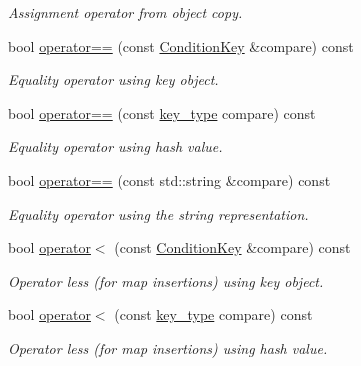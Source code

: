 \begin{DoxyCompactItemize}
\begin{DoxyCompactList}\small\item\em Assignment operator from object copy. \end{DoxyCompactList}\item 
bool \hyperlink{class_d_d4hep_1_1_conditions_1_1_condition_key_a57ce7c47f281c85dd5b584e28589c30f}{operator==} (const \hyperlink{class_d_d4hep_1_1_conditions_1_1_condition_key}{Condition\+Key} \&compare) const
\begin{DoxyCompactList}\small\item\em Equality operator using key object. \end{DoxyCompactList}\item 
bool \hyperlink{class_d_d4hep_1_1_conditions_1_1_condition_key_ab2a131ace8a307026b381ea2c9e9931a}{operator==} (const \hyperlink{class_d_d4hep_1_1_conditions_1_1_condition_key_a08bfc8ccb807bdd5e4d9f3b065d1c8f5}{key\+\_\+type} compare) const
\begin{DoxyCompactList}\small\item\em Equality operator using hash value. \end{DoxyCompactList}\item 
bool \hyperlink{class_d_d4hep_1_1_conditions_1_1_condition_key_afdad64fd8d109fdaf668a5bb0b1daba9}{operator==} (const std\+::string \&compare) const
\begin{DoxyCompactList}\small\item\em Equality operator using the string representation. \end{DoxyCompactList}\item 
bool \hyperlink{class_d_d4hep_1_1_conditions_1_1_condition_key_a86b3b301db1016d6e2ce16df3b79d924}{operator$<$} (const \hyperlink{class_d_d4hep_1_1_conditions_1_1_condition_key}{Condition\+Key} \&compare) const
\begin{DoxyCompactList}\small\item\em Operator less (for map insertions) using key object. \end{DoxyCompactList}\item 
bool \hyperlink{class_d_d4hep_1_1_conditions_1_1_condition_key_a6d10b8fecbe77dd306aac3aa7990d194}{operator$<$} (const \hyperlink{class_d_d4hep_1_1_conditions_1_1_condition_key_a08bfc8ccb807bdd5e4d9f3b065d1c8f5}{key\+\_\+type} compare) const
\begin{DoxyCompactList}\small\item\em Operator less (for map insertions) using hash value. \end{DoxyCompactList}\item 

\end{DoxyCompactItemize}
